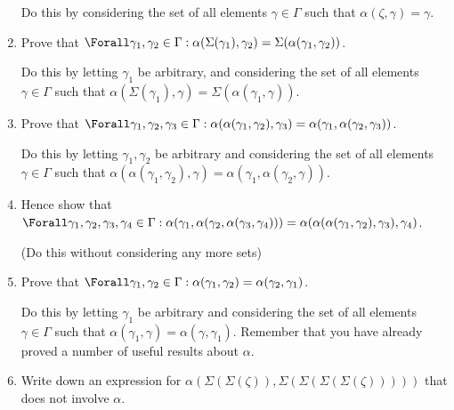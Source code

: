 \begin{enumerate}
  Do this by considering the set of all elements \(\gamma \in \Gamma\) such that
  \(\alpha(\zeta, \gamma) = \gamma\).
 \item
  Prove that
  \(\Forall \gamma_1, \gamma_2 \in \Gamma :
    \alpha(\Sigma(\gamma_1), \gamma_2) = \Sigma(\alpha(\gamma_1, \gamma_2))\).

  Do this by letting \(\gamma_1\) be arbitrary, and considering the set of all
  elements \(\gamma \in \Gamma\) such that
  \(\alpha(\Sigma(\gamma_1), \gamma) = \Sigma(\alpha(\gamma_1, \gamma))\).
 \item
  Prove that
  \(\Forall \gamma_1, \gamma_2, \gamma_3 \in \Gamma :
    \alpha(\alpha(\gamma_1, \gamma_2), \gamma_3) =
    \alpha(\gamma_1, \alpha(\gamma_2, \gamma_3))\).

  Do this by letting \(\gamma_1, \gamma_2\) be arbitrary and considering the set
  of all elements \(\gamma \in \Gamma\) such that
  \(\alpha(\alpha(\gamma_1, \gamma_2), \gamma)
  = \alpha(\gamma_1, \alpha(\gamma_2, \gamma))\).
 \item
  Hence show that
  \(\Forall \gamma_1, \gamma_2, \gamma_3, \gamma_4 \in \Gamma :
    \alpha(\gamma_1, \alpha(\gamma_2, \alpha(\gamma_3, \gamma_4))) =
    \alpha(\alpha(\alpha(\gamma_1, \gamma_2), \gamma_3), \gamma_4)\).

  (Do this without considering any more sets)
 \item
  Prove that
  \(\Forall \gamma_1, \gamma_2 \in \Gamma :
    \alpha(\gamma_1, \gamma_2) = \alpha(\gamma_2, \gamma_1)\).

  Do this by letting \(\gamma_1\) be arbitrary and considering the set of all
  elements \(\gamma \in \Gamma\) such that
  \(\alpha(\gamma_1, \gamma) = \alpha(\gamma, \gamma_1)\). Remember that you
  have already proved a number of useful results about \(\alpha\).
 \item
  Write down an expression for
  \(\alpha(\Sigma(\Sigma(\zeta)), \Sigma(\Sigma(\Sigma(\Sigma(\zeta)))))\) that
  does not involve \(\alpha\).


\end{enumerate}
